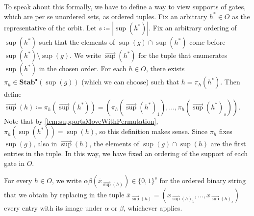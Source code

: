 \documentclass[11pt]{article}
\DeclareMathOperator{\supp}{sup}
\newcommand{\StabP}{\mathbf{Stab}^{\bullet}}
\theoremstyle{definition}
\theoremstyle{plain}
\theoremstyle{remark}
\theoremstyle{remark}
\begin{document}
To speak about this formally, we have to define a way to view supports of gates, which are per se unordered sets, as ordered tuples. 
Fix an arbitrary $h^* \in O$ as the representative of the orbit.  Let $s \coloneqq |\supp(h^*)|$. Fix an arbitrary ordering of $\supp(h^*)$ such that the elements of $\supp(g) \cap \supp(h^*)$ come before $\supp(h^*) \setminus \supp(g)$.
We write $\vec{\supp}(h^*)$ for the tuple that enumerates $\supp(h^*)$ in the chosen order. For each $h \in O$, there exists $\pi_{h} \in \StabP(\supp(g))$ (which we can choose) such that $h = \pi_{h}(h^*)$. Then define $\vec{\supp}(h) \coloneqq \pi_{h}(\vec{\supp}(h^*)) = ( \pi_{h}(\vec{\supp}(h^*)_1), \dots, \pi_{h}(\vec{\supp}(h^*)_s))$. Note that by \cref{lem:supportsMoveWithPermutation}, $\pi_{h}(\supp(h^*)) = \supp(h)$, so this definition makes sense. Since $\pi_{h}$ fixes $\supp(g)$, also in $\vec{\supp}(h)$, the elements of $\supp(g) \cap \supp(h)$ are the first entries in the tuple. In this way, we have fixed an ordering of the support of each gate in $O$. 


For every $h \in O$, we write $\alpha\beta(\bar{x}_{\vec{\supp}(h)}) \in \{0,1\}^{s}$ for the ordered binary string that we obtain by replacing in the tuple $\bar{x}_{\vec{\supp}(h)}  = (x_{\vec{\supp}(h)_1}, \dots, x_{\vec{\supp}(h)_s})$ every entry with its image under $\alpha$ or $\beta$, whichever applies.
\end{document}
